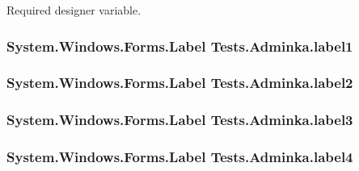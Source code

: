 Required designer variable. 

\subsubsection[{\texorpdfstring{label1}{label1}}]{\setlength{\rightskip}{0pt plus 5cm}System.\+Windows.\+Forms.\+Label Tests.\+Adminka.\+label1\hspace{0.3cm}{\ttfamily [private]}}\hypertarget{class_tests_1_1_adminka_a79972d46b6074e3267bc67a0ebb2b469}{}\label{class_tests_1_1_adminka_a79972d46b6074e3267bc67a0ebb2b469}
\subsubsection[{\texorpdfstring{label2}{label2}}]{\setlength{\rightskip}{0pt plus 5cm}System.\+Windows.\+Forms.\+Label Tests.\+Adminka.\+label2\hspace{0.3cm}{\ttfamily [private]}}\hypertarget{class_tests_1_1_adminka_a4e29fe60d58caf22ebd38a346fe0642b}{}\label{class_tests_1_1_adminka_a4e29fe60d58caf22ebd38a346fe0642b}
\subsubsection[{\texorpdfstring{label3}{label3}}]{\setlength{\rightskip}{0pt plus 5cm}System.\+Windows.\+Forms.\+Label Tests.\+Adminka.\+label3\hspace{0.3cm}{\ttfamily [private]}}\hypertarget{class_tests_1_1_adminka_a1fd7ef809e9adab2568fd45e3b2c2206}{}\label{class_tests_1_1_adminka_a1fd7ef809e9adab2568fd45e3b2c2206}
\subsubsection[{\texorpdfstring{label4}{label4}}]{\setlength{\rightskip}{0pt plus 5cm}System.\+Windows.\+Forms.\+Label Tests.\+Adminka.\+label4\hspace{0.3cm}{\ttfamily [private]}}\hypertarget{class_tests_1_1_adminka_a6d79a07b77f8747b51fc2fdae76cd37e}{}\label{class_tests_1_1_adminka_a6d79a07b77f8747b51fc2fdae76cd37e}
